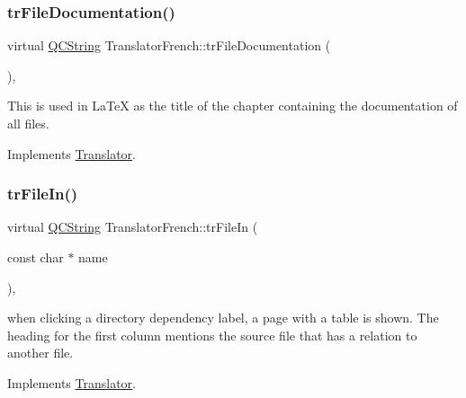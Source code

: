 \mbox{\label{class_translator_french_a69b7290ff910f71d7bc943feebd9a521}} 
\subsubsection{\texorpdfstring{trFileDocumentation()}{trFileDocumentation()}}
{\footnotesize\ttfamily virtual \mbox{\hyperlink{class_q_c_string}{Q\+C\+String}} Translator\+French\+::tr\+File\+Documentation (\begin{DoxyParamCaption}{ }\end{DoxyParamCaption})\hspace{0.3cm}{\ttfamily [inline]}, {\ttfamily [virtual]}}

This is used in La\+TeX as the title of the chapter containing the documentation of all files. 

Implements \mbox{\hyperlink{class_translator}{Translator}}.

\mbox{\label{class_translator_french_a304782878d3e3d17942f6a96712ce84c}} 
\subsubsection{\texorpdfstring{trFileIn()}{trFileIn()}}
{\footnotesize\ttfamily virtual \mbox{\hyperlink{class_q_c_string}{Q\+C\+String}} Translator\+French\+::tr\+File\+In (\begin{DoxyParamCaption}\item[{const char $\ast$}]{name }\end{DoxyParamCaption})\hspace{0.3cm}{\ttfamily [inline]}, {\ttfamily [virtual]}}

when clicking a directory dependency label, a page with a table is shown. The heading for the first column mentions the source file that has a relation to another file. 

Implements \mbox{\hyperlink{class_translator}{Translator}}.

\mbox{\label{class_translator_french_afea99f1e24f607ba4afc0e3d9d4ab171}} 
